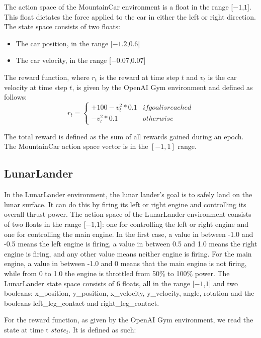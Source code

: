 The action space of the MountainCar environment is a float in the range [$-1$,$1$]. This float dictates the force applied to the car in either the left or right direction. The state space consists of two floats:
\begin{itemize}
    \item[] The car position, in the range [$-1.2$,$0.6$]
    \item[] The car velocity, in the range [$-0.07$,$0.07$]
\end{itemize}

The reward function, where $r_t$ is the reward at time step $t$ and $v_t$ is the car velocity at time step $t$, is given by the OpenAI Gym environment and defined as follows:
\begin{equation}
    r_t =
    \begin{cases*}
      +100 -v_t^2 * 0.1 & if goal is reached \\
      -v_t^2 * 0.1 & otherwise
    \end{cases*}
\end{equation}

The total reward is defined as the sum of all rewards gained during an epoch. The MountainCar action space vector is in the $[-1,1]$ range. 

\subsection{LunarLander}
In the LunarLander environment, the lunar lander's goal is to safely land on the lunar surface. It can do this by firing its left or right engine and controlling its overall thrust power. The action space of the LunarLander environment consists of two floats in the range [$-1$,$1$]: one for controlling the left or right engine and one for controlling the main engine. In the first case, a value in between -1.0 and -0.5 means the left engine is firing, a value in between 0.5 and 1.0 means the right engine is firing, and any other value means neither engine is firing. For the main engine, a value in between -1.0 and 0 means that the main engine is not firing, while from 0 to 1.0 the engine is throttled from 50\% to 100\% power. The LunarLander state space consists of 6 floats, all in the range [$-1$,$1$] and two booleans: x\_position, y\_position, x\_velocity, y\_velocity, angle, rotation and the booleans left\_leg\_contact and right\_leg\_contact.  

For the reward function, as given by the OpenAI Gym environment, we read the state at time t $state_t$. It is defined as such:

